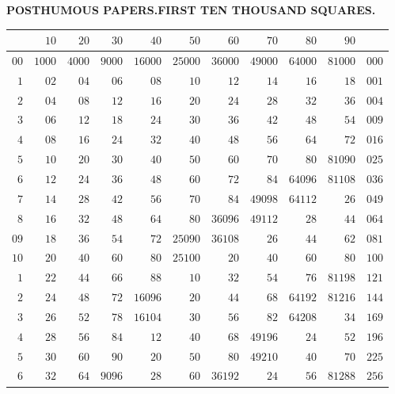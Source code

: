 \clearpage{}%
\renewcommand{\BookRunningTitle}{First Ten Thousand Squares}
\begin{center}\textbf{POSTHUMOUS PAPERS.\quad FIRST TEN THOUSAND SQUARES.}\end{center}
\begingroup\fontsize{8.5}{10}\selectfont\setlength{\tabcolsep}{2pt}\renewcommand{\arraystretch}{1}
\begin{longtable}{@{}r|r|r|r|r|r|r|r|r|r|r@{}}
\hline
 & $10$ & $20$ & $30$ & $40$ & $50$ & $60$ & $70$ & $80$ & $90$ & \\
\hline\endhead
$00$ & $1000$ & $4000$ & $9000$ & $16000$ & $25000$ & $36000$ & $49000$ & $64000$ & $81000$ & $000$\\
$1$ & $02$ & $04$ & $06$ & $08$ & $10$ & $12$ & $14$ & $16$ & $18$ & $001$\\
$2$ & $04$ & $08$ & $12$ & $16$ & $20$ & $24$ & $28$ & $32$ & $36$ & $004$\\
$3$ & $06$ & $12$ & $18$ & $24$ & $30$ & $36$ & $42$ & $48$ & $54$ & $009$\\
$4$ & $08$ & $16$ & $24$ & $32$ & $40$ & $48$ & $56$ & $64$ & $72$ & $016$\\
$5$ & $10$ & $20$ & $30$ & $40$ & $50$ & $60$ & $70$ & $80$ & $81090$ & $025$\\
$6$ & $12$ & $24$ & $36$ & $48$ & $60$ & $72$ & $84$ & $64096$ & $81108$ & $036$\\
$7$ & $14$ & $28$ & $42$ & $56$ & $70$ & $84$ & $49098$ & $64112$ & $26$ & $049$\\
$8$ & $16$ & $32$ & $48$ & $64$ & $80$ & $36096$ & $49112$ & $28$ & $44$ & $064$\\
$09$ & $18$ & $36$ & $54$ & $72$ & $25090$ & $36108$ & $26$ & $44$ & $62$ & $081$\\
$10$ & $20$ & $40$ & $60$ & $80$ & $25100$ & $20$ & $40$ & $60$ & $80$ & $100$\\
$1$ & $22$ & $44$ & $66$ & $88$ & $10$ & $32$ & $54$ & $76$ & $81198$ & $121$\\
$2$ & $24$ & $48$ & $72$ & $16096$ & $20$ & $44$ & $68$ & $64192$ & $81216$ & $144$\\
$3$ & $26$ & $52$ & $78$ & $16104$ & $30$ & $56$ & $82$ & $64208$ & $34$ & $169$\\
$4$ & $28$ & $56$ & $84$ & $12$ & $40$ & $68$ & $49196$ & $24$ & $52$ & $196$\\
$5$ & $30$ & $60$ & $90$ & $20$ & $50$ & $80$ & $49210$ & $40$ & $70$ & $225$\\
$6$ & $32$ & $64$ & $9096$ & $28$ & $60$ & $36192$ & $24$ & $56$ & $81288$ & $256$\\

\end{longtable}
